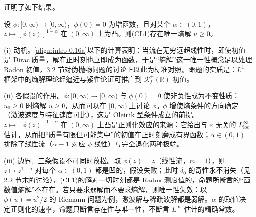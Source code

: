 \documentclass[../main.tex]{subfiles}
\begin{document}
证明了如下结果。

\begin{proposition}\label{proposition:intro-0.2.3}
设 $\phi:[0,\infty)\to[0,\infty)$，$\phi(0)=0$ 为增函数，且对某个 $\alpha\in(0,1)$，$z\mapsto[\phi(z)]^{1-\alpha}$ 在 $(0,\infty)$ 上为凸。则(CL1)存在唯一熵解 $u\geqslant0$。
\end{proposition}

\begin{remark}\label{remark:intro-0.2.3-动机}
(i) 动机。\eqref{align:intro-0.16a}以下的计算表明：当流在无穷远超线性时，即使初值是 Dirac 质量，解在正时刻也立即成为函数，于是“熵解”这一唯一性概念足以处理 Radon 初值，3.2 节对伪抛物问题的讨论正以此为标准对照。命题的实质是：$L^1$ 框架中的熵解理论经逼近与紧性论证可推广到 $\mathscr{R}^+_f(\mathbb{R})$ 初值。

(ii) 各假设的作用。$\phi:[0,\infty)\to[0,\infty)$ 与 $\phi(0)=0$ 使非负性成为不变性质：$u_0\geqslant0$ 时熵解 $u\geqslant0$，从而可以在 $[0,\infty)$ 上讨论 $\phi$。$\phi$ 增使熵条件的方向确定（激波速度与特征速度可比），这是 Oleinik 型条件成立的前提。$z\mapsto[\phi(z)]^{1-\alpha}$ 在 $(0,\infty)$ 上凸是正则化效应的来源：它给出与 $\varepsilon$ 无关的 $L^\infty_{\mathrm{loc}}$ 估计，从而把“质量有限但可能集中”的初值在正时刻磨成有界函数；$\alpha\in(0,1)$ 排除了线性流（$\alpha=1$ 对应 $\phi$ 线性）与完全退化两种极端。

(iii) 边界。三条假设不可同时放松。取 $\phi(z)=z$（线性流，$m=1$），则 $z\mapsto z^{1-\alpha}$ 对每个 $\alpha\in(0,1)$ 都是凹的，假设失败；此时 $\delta_0$ 的奇性永不消失（见 2.2 节末的讨论），(CL1)的解对一切时刻都是 Radon 测度值的，命题所断言的“函数值熵解”不存在。若只要求弱解而不要求熵解，则唯一性失效：以 $\phi(u)=u^2/2$ 的 Riemann 问题为例，激波解与稀疏波解都是弱解。$\alpha$ 的取值决定正则化的速率，命题只断言存在性与唯一性，不断言 $L^\infty$ 估计的精确常数。
\end{remark}
\end{document}

